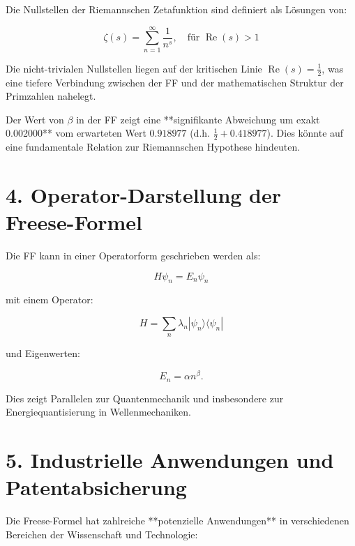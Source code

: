 \documentclass[a4paper,12pt]{article}
\begin{document}
Die Nullstellen der Riemannschen Zetafunktion sind definiert als Lösungen von:

\begin{equation}
\zeta(s) = \sum_{n=1}^{\infty} \frac{1}{n^s}, \quad \text{für } \operatorname{Re}(s) > 1
\end{equation}

Die nicht-trivialen Nullstellen liegen auf der kritischen Linie $\operatorname{Re}(s) = \frac{1}{2}$, was eine tiefere Verbindung zwischen der FF und der mathematischen Struktur der Primzahlen nahelegt. 

Der Wert von $\beta$ in der FF zeigt eine **signifikante Abweichung um exakt 0.002000** vom erwarteten Wert $0.918977$ (d.h. $\frac{1}{2} + 0.418977$). Dies könnte auf eine fundamentale Relation zur Riemannschen Hypothese hindeuten.

\section*{4. Operator-Darstellung der Freese-Formel}

Die FF kann in einer Operatorform geschrieben werden als:

\begin{equation}
H \psi_n = E_n \psi_n
\end{equation}

mit einem Operator:

\begin{equation}
H = \sum_{n} \lambda_n |\psi_n\rangle \langle\psi_n|
\end{equation}

und Eigenwerten:

\begin{equation}
E_n = \alpha n^\beta.
\end{equation}

Dies zeigt Parallelen zur Quantenmechanik und insbesondere zur Energiequantisierung in Wellenmechaniken.

\section*{5. Industrielle Anwendungen und Patentabsicherung}

Die Freese-Formel hat zahlreiche **potenzielle Anwendungen** in verschiedenen Bereichen der Wissenschaft und Technologie:
\end{document}
